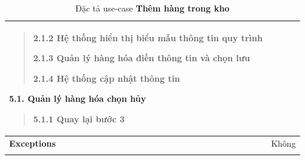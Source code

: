 \begin{longtable}{| p{} | p{} |}
\begin{quote}
                        2.1.2 Hệ thống hiển thị biểu mẫu thông tin quy trình
                        
                        2.1.3 Quản lý hàng hóa điền thông tin và chọn lưu
                        
                        2.1.4 Hệ thống cập nhật thông tin
                    \end{quote}
                5.1. Quản lý hàng hóa chọn hủy
                    \begin{quote} 
                    5.1.1 Quay lại bước 3
                    \end{quote}
                \\
                \hline
                    \textbf{Exceptions} 
                &
                    Không
                \\
                \hline
                \caption{Đặc tả use-case \textbf{Thêm hàng trong kho}}
            \end{longtable}

